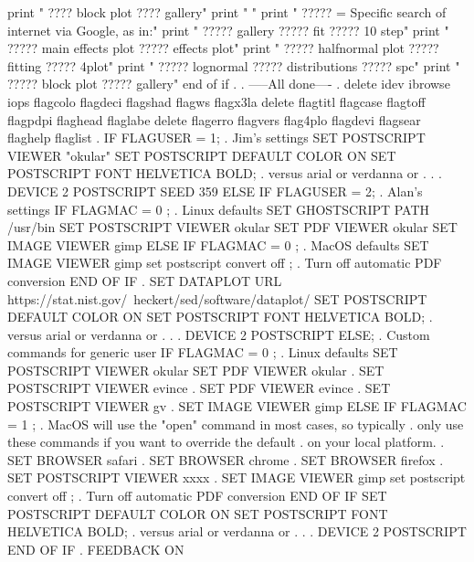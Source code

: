    print "          ???? block plot   ???? gallery"
   print " "
   print "  ????? = Specific search of internet via Google, as in:"
   print "          ????? gallery   ????? fit   ????? 10 step"
   print "          ????? main effects plot   ????? effects plot"
   print "          ????? halfnormal plot     ????? fitting   ????? 4plot"
   print "          ????? lognormal   ????? distributions   ????? spc"
   print "          ????? block plot   ????? gallery"
end of if
.
. -----All done----
.
delete idev ibrowse iops flagcolo flagdeci flagshad flagws flagx3la
delete flagtitl flagcase flagtoff flagpdpi flaghead flaglabe
delete flagerro flagvers flag4plo flagdevi flagsear flaghelp flaglist
.
IF FLAGUSER = 1; . Jim's settings
   SET POSTSCRIPT VIEWER "okular"
   SET POSTSCRIPT DEFAULT COLOR ON
   SET POSTSCRIPT FONT HELVETICA BOLD; . versus arial or verdanna or . . .
   DEVICE 2 POSTSCRIPT
   SEED 359
ELSE IF FLAGUSER = 2; . Alan's settings
   IF FLAGMAC = 0 ; . Linux defaults
      SET GHOSTSCRIPT PATH /usr/bin
      SET POSTSCRIPT VIEWER okular
      SET PDF VIEWER okular
      SET IMAGE VIEWER gimp
   ELSE IF FLAGMAC = 0 ; . MacOS defaults
      SET IMAGE VIEWER gimp
      set postscript convert off ; . Turn off automatic PDF conversion
   END OF IF
   . SET DATAPLOT URL https://stat.nist.gov/~heckert/sed/software/dataplot/
   SET POSTSCRIPT DEFAULT COLOR ON
   SET POSTSCRIPT FONT HELVETICA BOLD; . versus arial or verdanna or . . .
   DEVICE 2 POSTSCRIPT
ELSE; . Custom commands for generic user
   IF FLAGMAC = 0 ; . Linux defaults
      SET POSTSCRIPT VIEWER okular
      SET PDF VIEWER okular
      . SET POSTSCRIPT VIEWER evince
      . SET PDF VIEWER evince
      . SET POSTSCRIPT VIEWER gv
      . SET IMAGE VIEWER gimp
   ELSE IF FLAGMAC = 1 ;
      . MacOS will use the "open" command in most cases, so typically
      . only use these commands if you want to override the default
      . on your local platform.
      . SET BROWSER safari
      . SET BROWSER chrome
      . SET BROWSER firefox
      . SET POSTSCRIPT VIEWER xxxx
      . SET IMAGE VIEWER gimp
      set postscript convert off ; . Turn off automatic PDF conversion
   END OF IF
   SET POSTSCRIPT DEFAULT COLOR ON
   SET POSTSCRIPT FONT HELVETICA BOLD; . versus arial or verdanna or . . .
   DEVICE 2 POSTSCRIPT
END OF IF
.
FEEDBACK ON
